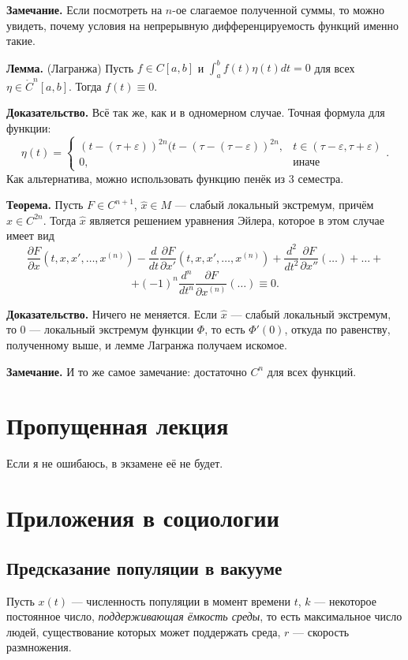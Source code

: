 \textbf{Замечание.} Если посмотреть на $n$-ое слагаемое полученной суммы, то можно увидеть, почему условия на непрерывную дифференцируемость функций именно такие.

\textbf{Лемма.} (Лагранжа) Пусть $f \in C[a, b]$ и $\int_a^b f(t) \eta(t) dt = 0$ для всех $\eta \in \mathring C^n[a, b]$.
Тогда $f(t) \equiv 0$.

\textbf{Доказательство.} Всё так же, как и в одномерном случае.
Точная формула для функции:
\[
    \eta(t) =
    \begin{cases}
        (t - (\tau + \varepsilon))^{2n} (t - (\tau - (\tau - \varepsilon))^{2n}, & t \in (\tau - \varepsilon, \tau + \varepsilon) \\
        0, & \text{иначе}
    \end{cases} .
\]
Как альтернатива, можно использовать функцию пенёк из 3 семестра.

\QED

\textbf{Теорема.} Пусть $F \in C^{n+1}$, $\widehat x \in M$ --- слабый локальный экстремум, причём $\widehat x \in C^{2n}$.
Тогда $\widehat x$ является решением уравнения Эйлера, которое в этом случае имеет вид
\[
    \frac{\partial F}{\partial x}(t, x, x', \dots, x^{(n)}) - \frac{d}{dt} \frac{\partial F}{\partial x'} (t, x, x', \dots, x^{(n)}) + \frac{d^2}{dt^2} \frac{\partial F}{\partial x''}(\dots) + \dots +
\]
\[
    + (-1)^n \frac{d^n}{dt^n} \frac{\partial F}{\partial x^{(n)}}(\dots) \equiv 0.
\]

\textbf{Доказательство.} Ничего не меняется. Если $\widehat x$ --- слабый локальный экстремум, то $0$ --- локальный экстремум функции $\Phi$, то есть $\Phi'(0)$, откуда по равенству, полученному выше, и лемме Лагранжа получаем искомое.

\QED

\textbf{Замечание.} И то же самое замечание: достаточно $C^n$ для всех функций.

\section{Пропущенная лекция}
Если я не ошибаюсь, в экзамене её не будет.

\section{Приложения в социологии}
\subsection{Предсказание популяции в вакууме}
Пусть $x(t)$ --- численность популяции в момент времени $t$, $k$ --- некоторое постоянное число, \textit{поддерживающая ёмкость среды}, то есть максимальное число людей, существование которых может поддержать среда, $r$ --- скорость размножения.

